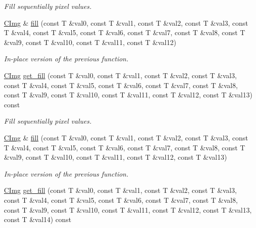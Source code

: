 \begin{DoxyCompactItemize}
\begin{DoxyCompactList}\small\item\em Fill sequentially pixel values. \end{DoxyCompactList}\item 
\hypertarget{structcimg__library_1_1_c_img_a1ecd792063de38175282ecb791eb3cc9}{\hyperlink{structcimg__library_1_1_c_img}{C\-Img} \& \hyperlink{structcimg__library_1_1_c_img_a1ecd792063de38175282ecb791eb3cc9}{fill} (const T \&val0, const T \&val1, const T \&val2, const T \&val3, const T \&val4, const T \&val5, const T \&val6, const T \&val7, const T \&val8, const T \&val9, const T \&val10, const T \&val11, const T \&val12)}\label{structcimg__library_1_1_c_img_a1ecd792063de38175282ecb791eb3cc9}

\begin{DoxyCompactList}\small\item\em In-\/place version of the previous function. \end{DoxyCompactList}\item 
\hypertarget{structcimg__library_1_1_c_img_a5b75fc7baa6d8807abb6f8cb09d4f747}{\hyperlink{structcimg__library_1_1_c_img}{C\-Img} \hyperlink{structcimg__library_1_1_c_img_a5b75fc7baa6d8807abb6f8cb09d4f747}{get\-\_\-fill} (const T \&val0, const T \&val1, const T \&val2, const T \&val3, const T \&val4, const T \&val5, const T \&val6, const T \&val7, const T \&val8, const T \&val9, const T \&val10, const T \&val11, const T \&val12, const T \&val13) const }\label{structcimg__library_1_1_c_img_a5b75fc7baa6d8807abb6f8cb09d4f747}

\begin{DoxyCompactList}\small\item\em Fill sequentially pixel values. \end{DoxyCompactList}\item 
\hypertarget{structcimg__library_1_1_c_img_a68a94da3ea6d660c4698c44f02649bce}{\hyperlink{structcimg__library_1_1_c_img}{C\-Img} \& \hyperlink{structcimg__library_1_1_c_img_a68a94da3ea6d660c4698c44f02649bce}{fill} (const T \&val0, const T \&val1, const T \&val2, const T \&val3, const T \&val4, const T \&val5, const T \&val6, const T \&val7, const T \&val8, const T \&val9, const T \&val10, const T \&val11, const T \&val12, const T \&val13)}\label{structcimg__library_1_1_c_img_a68a94da3ea6d660c4698c44f02649bce}

\begin{DoxyCompactList}\small\item\em In-\/place version of the previous function. \end{DoxyCompactList}\item 
\hypertarget{structcimg__library_1_1_c_img_aa8c74d22509ffe934c580bfc50301ef7}{\hyperlink{structcimg__library_1_1_c_img}{C\-Img} \hyperlink{structcimg__library_1_1_c_img_aa8c74d22509ffe934c580bfc50301ef7}{get\-\_\-fill} (const T \&val0, const T \&val1, const T \&val2, const T \&val3, const T \&val4, const T \&val5, const T \&val6, const T \&val7, const T \&val8, const T \&val9, const T \&val10, const T \&val11, const T \&val12, const T \&val13, const T \&val14) const }\label{structcimg__library_1_1_c_img_aa8c74d22509ffe934c580bfc50301ef7}


\end{DoxyCompactItemize}
